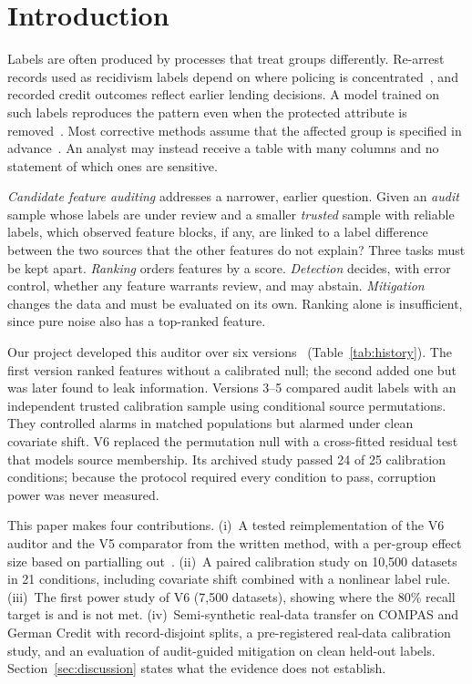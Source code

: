 \documentclass[conference]{IEEEtran}
\newcommand{\Vsix}{V6}
\newcommand{\Vfive}{V5}
\begin{document}
\section{Introduction}
Labels are often produced by processes that treat groups differently. Re-arrest records used as recidivism labels depend on where policing is concentrated~\cite{angwin2016machine,chouldechova2017fair}, and recorded credit outcomes reflect earlier lending decisions. A model trained on such labels reproduces the pattern even when the protected attribute is removed~\cite{mehrabi2021survey}. Most corrective methods assume that the affected group is specified in advance~\cite{kamiran2012data,feldman2015certifying,jiang2020identifying,blum2020recovering}. An analyst may instead receive a table with many columns and no statement of which ones are sensitive.

\emph{Candidate feature auditing} addresses a narrower, earlier question. Given an \emph{audit} sample whose labels are under review and a smaller \emph{trusted} sample with reliable labels, which observed feature blocks, if any, are linked to a label difference between the two sources that the other features do not explain? Three tasks must be kept apart. \emph{Ranking} orders features by a score. \emph{Detection} decides, with error control, whether any feature warrants review, and may abstain. \emph{Mitigation} changes the data and must be evaluated on its own. Ranking alone is insufficient, since pure noise also has a top-ranked feature.

Our project developed this auditor over six versions~\cite{salwan2026report,team2026manuscript} (Table~\ref{tab:history}). The first version ranked features without a calibrated null; the second added one but was later found to leak information. Versions 3--5 compared audit labels with an independent trusted calibration sample using conditional source permutations. They controlled alarms in matched populations but alarmed under clean covariate shift. \Vsix{} replaced the permutation null with a cross-fitted residual test that models source membership. Its archived study passed 24 of 25 calibration conditions; because the protocol required every condition to pass, corruption power was never measured.

This paper makes four contributions. (i)~A tested reimplementation of the \Vsix{} auditor and the \Vfive{} comparator from the written method, with a per-group effect size based on partialling out~\cite{robinson1988root,chernozhukov2018double}. (ii)~A paired calibration study on 10,500 datasets in 21 conditions, including covariate shift combined with a nonlinear label rule. (iii)~The first power study of \Vsix{} (7,500 datasets), showing where the 80\% recall target is and is not met. (iv)~Semi-synthetic real-data transfer on COMPAS and German Credit with record-disjoint splits, a pre-registered real-data calibration study, and an evaluation of audit-guided mitigation on clean held-out labels. Section~\ref{sec:discussion} states what the evidence does not establish.
\end{document}
